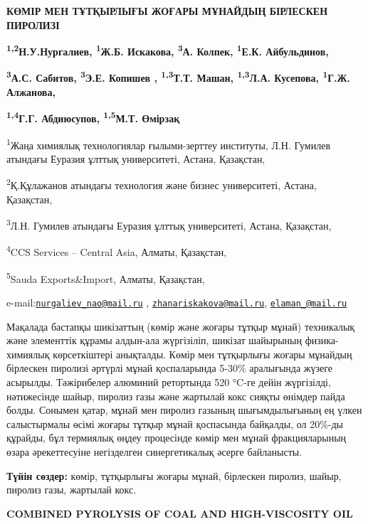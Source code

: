 {\bfseries КӨМІР МЕН ТҰТҚЫРЛЫҒЫ ЖОҒАРЫ МҰНАЙДЫҢ БІРЛЕСКЕН ПИРОЛИЗІ}

{\bfseries \textsuperscript{1,2}Н.У.Нургалиев\textsuperscript{\envelope },
\textsuperscript{1}Ж.Б. Искакова\textsuperscript{\envelope },
\textsuperscript{3}А. Колпек, \textsuperscript{1}Е.К.
Айбульдинов\textsuperscript{\envelope },}

{\bfseries \textsuperscript{3}А.С. Сабитов, \textsuperscript{3}Э.Е. Копишев
, \textsuperscript{1,3}Т.Т. Машан, \textsuperscript{1,3}Л.А. Кусепова,
\textsuperscript{1}Г.Ж. Алжанова,}

{\bfseries \textsuperscript{1,4}Г.Г. Абдиюсупов, \textsuperscript{1,5}М.Т.
Өмірзақ}

\textsuperscript{1}Жаңа химиялық технологиялар ғылыми-зерттеу институты,
Л.Н. Гумилев атындағы Еуразия ұлттық университеті, Астана, Қазақстан,

\textsuperscript{2}Қ.Құлажанов атындағы технология және бизнес
университеті, Астана, Қазақстан,

\textsuperscript{3}Л.Н. Гумилев атындағы Еуразия ұлттық университеті,
Астана, Қазақстан,

\textsuperscript{4}CCS Services -- Central Asia, Алматы, Қазақстан,

\textsuperscript{5}Sauda Exports\&Import, Алматы, Қазақстан,

e-mail:\href{mailto:nurgaliev_nao@mail.ru}{\nolinkurl{nurgaliev\_nao@mail.ru}}
,
\href{mailto:zhanariskakova@mail.ru}{\nolinkurl{zhanariskakova@mail.ru}},
\href{mailto:elaman_@mail.ru}{\nolinkurl{elaman\_@mail.ru}}

Мақалада бастапқы шикізаттың (көмір және жоғары тұтқыр мұнай) техникалық
және элементтік құрамы алдын-ала жүргізіліп, шикізат шайырының
физика-химиялық көрсеткіштері анықталды. Көмір мен тұтқырлығы жоғары
мұнайдың бірлескен пиролизі әртүрлі мұнай қоспаларында 5-30\% аралығында
жүзеге асырылды. Тәжірибелер алюминий ретортында 520 °C-ге дейін
жүргізілді, нәтижесінде шайыр, пиролиз газы және жартылай кокс сияқты
өнімдер пайда болды. Сонымен қатар, мұнай мен пиролиз газының
шығымдылығының ең үлкен салыстырмалы өсімі жоғары тұтқыр мұнай
қоспасында байқалды, ол 20\%-ды құрайды, бұл термиялық өңдеу процесінде
көмір мен мұнай фракцияларының өзара әрекеттесуіне негізделген
синергетикалық әсерге байланысты.

{\bfseries Түйін сөздер:} көмір, тұтқырлығы жоғары мұнай, бірлескен
пиролиз, шайыр, пиролиз газы, жартылай кокс.

{\bfseries COMBINED PYROLYSIS OF COAL AND HIGH-VISCOSITY OIL}

